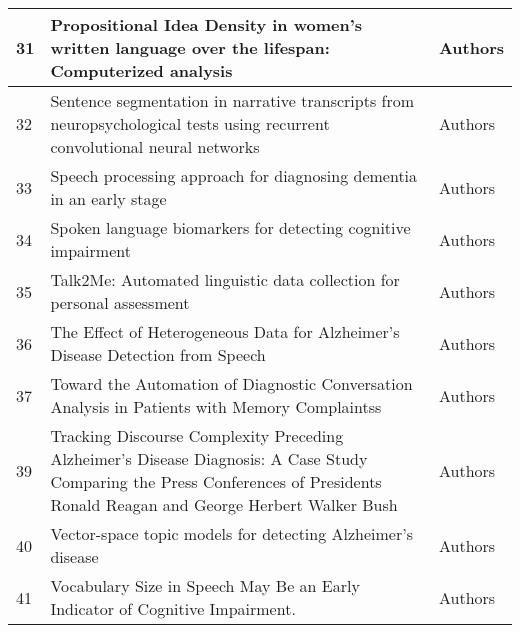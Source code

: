 \documentclass[12pt]{article}
\begin{document}
\begin{longtable}{ p{1cm} | p{6cm} | p{6cm}}
	31 & Propositional Idea Density in women’s written language over the lifespan: Computerized analysis & Authors \\ \hline
	32 & Sentence segmentation in narrative transcripts from neuropsychological tests using recurrent convolutional neural networks & Authors \\ \hline
	33 & Speech processing approach for diagnosing dementia in an early stage & Authors \\ \hline
	34 & Spoken language biomarkers for detecting cognitive impairment & Authors \\ \hline
	35 & Talk2Me: Automated linguistic data collection for personal assessment & Authors \\ \hline
	36 & The Effect of Heterogeneous Data for Alzheimer’s Disease Detection from Speech & Authors \\ \hline
	37 & Toward the Automation of Diagnostic Conversation Analysis in Patients with Memory Complaintss & Authors \\ \hline
	39 & Tracking Discourse Complexity Preceding Alzheimer's Disease Diagnosis: A Case Study Comparing the Press Conferences of Presidents Ronald Reagan and George Herbert Walker Bush & Authors \\ \hline
	40 & Vector-space topic models for detecting Alzheimer's disease & Authors \\ \hline
	41 & Vocabulary Size in Speech May Be an Early Indicator of Cognitive Impairment. & Authors \\ \hline
\end{longtable}
\end{document}
